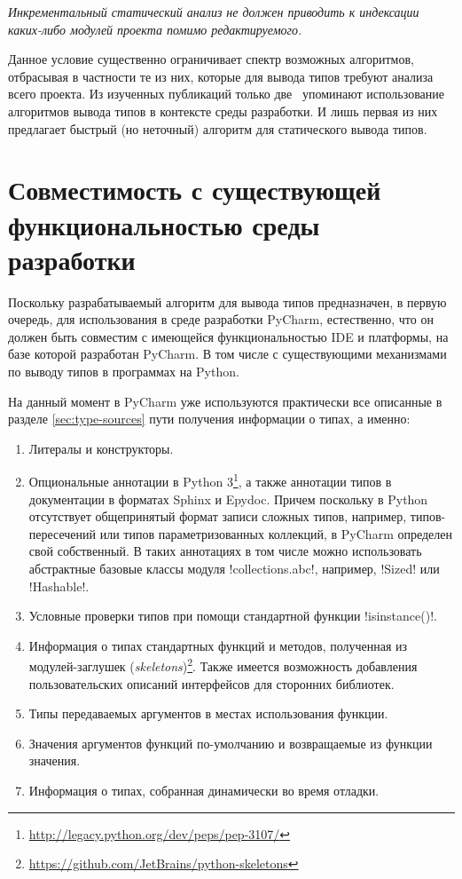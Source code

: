 \emph{Инкрементальный статический анализ не должен приводить к индексации 
 каких-либо модулей проекта помимо редактируемого.}

Данное условие существенно ограничивает спектр возможных алгоритмов, отбрасывая
в частности те из них, которые для вывода типов требуют анализа всего проекта. Из
 изученных публикаций только две~\cite{Pluquet2009,Haupt2011} упоминают
использование алгоритмов вывода типов в контексте среды разработки. И лишь
первая из них предлагает быстрый (но неточный) алгоритм для статического вывода типов.

\section{Совместимость с существующей функциональностью среды разработки}
\label{sec:compatibility-requirement}

Поскольку разрабатываемый алгоритм для вывода типов предназначен, в первую
очередь, для использования в среде разработки PyCharm, естественно, что он должен
быть совместим с имеющейся функциональностью IDE и платформы, на базе которой
разработан PyCharm. В том числе с существующими механизмами по выводу типов в
программах на Python. 

На данный момент в PyCharm уже используются практически все описанные в разделе
\ref{sec:type-sources} пути получения информации о типах, а именно:

\begin{enumerate}
    \item Литералы и конструкторы.

    \item Опциональные аннотации в Python
      3\footnote{\url{http://legacy.python.org/dev/peps/pep-3107/}}, а также
      аннотации типов в документации в форматах Sphinx и Epydoc. Причем поскольку в
      Python отсутствует общепринятый формат записи сложных типов, например,
      типов-пересечений или типов параметризованных коллекций, в PyCharm
      определен свой собственный.
      В таких аннотациях в том числе можно использовать абстрактные базовые
      классы модуля !collections.abc!, например, !Sized! или !Hashable!.

    \item Условные проверки типов при помощи стандартной функции !isinstance()!.

    \item Информация о типах стандартных функций и методов, полученная из
        модулей-заглушек
        (\emph{skeletons})\footnote{\url{https://github.com/JetBrains/python-skeletons}}.
        Также имеется возможность добавления пользовательских описаний
        интерфейсов для сторонних библиотек.

    \item Типы передаваемых аргументов в местах использования функции.

    \item Значения аргументов функций по-умолчанию и возвращаемые из функции
        значения.

    \item Информация о типах, собранная динамически во время отладки.
\end{enumerate}

